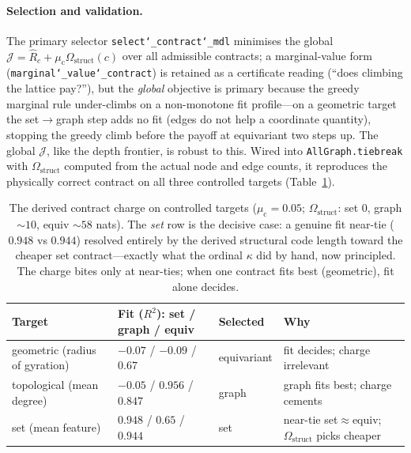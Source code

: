 \documentclass[11pt]{article}
\newcommand{\allowbreakhere}{\discretionary{}{}{}}
\newcommand{\code}[1]{\texttt{\def\_{\char`_\allowbreakhere}#1}}
\begin{document}
\paragraph{Selection and validation.} The primary selector \code{select\_contract\_mdl} minimises the
global $\mathcal J=\widehat R_c+\mu_{\mathrm c}\Omega_{\mathrm{struct}}(c)$ over all admissible contracts;
a marginal-value form (\code{marginal\_value\_contract}) is retained as a certificate reading (``does
climbing the lattice pay?''), but the \emph{global} objective is primary because the greedy marginal rule
under-climbs on a non-monotone fit profile---on a geometric target the set$\to$\allowbreak graph step adds no fit
(edges do not help a coordinate quantity), stopping the greedy climb before the payoff at equivariant two
steps up. The global $\mathcal J$, like the depth frontier, is robust to this. Wired into
\code{AllGraph.tiebreak} with $\Omega_{\mathrm{struct}}$ computed from the actual node and edge counts,
it reproduces the physically correct contract on all three controlled targets (Table~\ref{tab:contract-mdl}).

\begin{table}[h]
\centering
\small
\renewcommand{\arraystretch}{1.2}
\begin{tabular}{p{2.8cm} p{4.6cm} p{2.0cm} p{3.0cm}}
\toprule
\textbf{Target} & \textbf{Fit ($R^2$): set / graph / equiv} & \textbf{Selected} & \textbf{Why}\\
\midrule
geometric (radius of gyration) & $-0.07$ / $-0.09$ / $\mathbf{0.67}$ & equivariant & fit decides; charge irrelevant\\
topological (mean degree) & $-0.05$ / $\mathbf{0.956}$ / $0.847$ & graph & graph fits best; charge cements\\
set (mean feature) & $\mathbf{0.948}$ / $0.65$ / $0.944$ & set & near-tie set${\approx}$equiv; $\Omega_{\mathrm{struct}}$ picks cheaper\\
\bottomrule
\end{tabular}
\caption{The derived contract charge on controlled targets ($\mu_{\mathrm c}{=}0.05$;
$\Omega_{\mathrm{struct}}$: set $0$, graph ${\sim}10$, equiv ${\sim}58$ nats). The \emph{set} row is the
decisive case: a genuine fit near-tie ($0.948$ vs $0.944$) resolved entirely by the derived structural
code length toward the cheaper set contract---exactly what the ordinal $\kappa$ did by hand, now
principled. The charge bites only at near-ties; when one contract fits best (geometric), fit alone
decides.}
\label{tab:contract-mdl}
\end{table}
\end{document}
